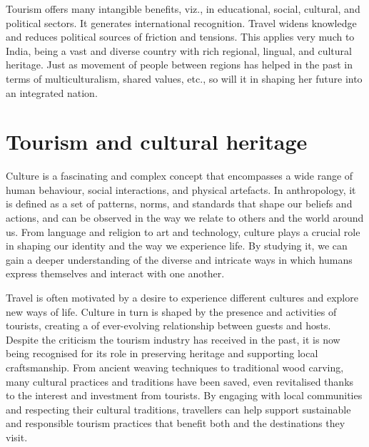 Tourism offers many intangible benefits, viz., in educational, social, cultural, and political sectors. It generates international recognition. Travel widens knowledge and reduces political sources of friction and tensions. This applies very much to India, being a vast and diverse country with rich regional, lingual, and cultural heritage. Just as movement of people between regions has helped in the past in terms of multiculturalism, shared values, etc., so will it in shaping her future into an integrated nation.


\section{Tourism and cultural heritage} %
\label{sec:tch}

Culture is a fascinating and complex concept that encompasses a wide range of human behaviour, social interactions, and physical artefacts. In anthropology, it is defined as a set of patterns, norms, and standards that shape our beliefs and actions, and can be observed in the way we relate to others and the world around us. From language and religion to art and technology, culture plays a crucial role in shaping our identity and the way we experience life. By studying it, we can gain a deeper understanding of the diverse and intricate ways in which humans express themselves and interact with one another.

Travel is often motivated by a desire to experience different cultures and explore new ways of life. Culture in turn is shaped by the presence and activities of tourists, creating a of ever-evolving relationship between guests and hosts. Despite the criticism the tourism industry has received in the past, it is now being recognised for its role in preserving heritage and supporting local craftsmanship. From ancient weaving techniques to traditional wood carving, many cultural practices and traditions have been saved, even revitalised thanks to the interest and investment from tourists. By engaging with local communities and respecting their cultural traditions, travellers can help support sustainable and responsible tourism practices that benefit both and the destinations they visit.


